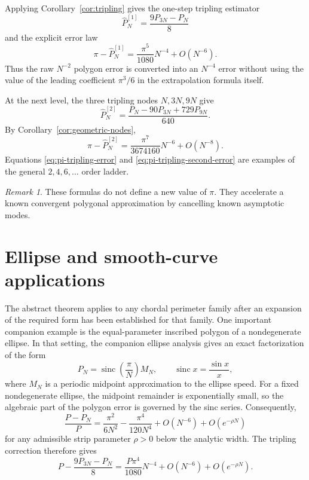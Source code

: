 \documentclass[11pt]{article}
\theoremstyle{remark}
\newtheorem{remark}[theorem]{Remark}
\newcommand{\sinc}{\operatorname{sinc}}
\begin{document}
Applying Corollary~\ref{cor:tripling} gives the one-step tripling estimator
\begin{equation}
\label{eq:pi-tripling}
\widehat P_N^{[1]}
=
\frac{9P_{3N}-P_N}{8}
\end{equation}
and the explicit error law
\begin{equation}
\label{eq:pi-tripling-error}
\pi-\widehat P_N^{[1]}
=
\frac{\pi^5}{1080}N^{-4}
+O(N^{-6}).
\end{equation}
Thus the raw $N^{-2}$ polygon error is converted into an $N^{-4}$ error
without using the value of the leading coefficient $\pi^3/6$ in the
extrapolation formula itself.

At the next level, the three tripling nodes $N,3N,9N$ give
\begin{equation}
\label{eq:pi-tripling-second}
\widehat P_N^{[2]}
=
\frac{P_N-90P_{3N}+729P_{9N}}{640}.
\end{equation}
By Corollary~\ref{cor:geometric-nodes},
\begin{equation}
\label{eq:pi-tripling-second-error}
\pi-\widehat P_N^{[2]}
=
\frac{\pi^7}{3674160}N^{-6}
+O(N^{-8}).
\end{equation}
Equations \eqref{eq:pi-tripling-error} and
\eqref{eq:pi-tripling-second-error} are examples of the general
$2,4,6,\ldots$ order ladder.

\begin{remark}
These formulas do not define a new value of $\pi$.  They accelerate a known
convergent polygonal approximation by cancelling known asymptotic modes.
\end{remark}

\section{Ellipse and smooth-curve applications}

The abstract theorem applies to any chordal perimeter family after an
expansion of the required form has been established for that family.  One
important companion example is the equal-parameter inscribed polygon of a
nondegenerate ellipse.  In that setting, the companion ellipse analysis gives
an exact factorization of the form
\begin{equation}
\label{eq:ellipse-factorization}
P_N
=
\sinc\!\left(\frac{\pi}{N}\right)M_N,
\qquad
\sinc x=\frac{\sin x}{x},
\end{equation}
where $M_N$ is a periodic midpoint approximation to the ellipse speed.  For a
fixed nondegenerate ellipse, the midpoint remainder is exponentially small,
so the algebraic part of the polygon error is governed by the sinc series.
Consequently,
\begin{equation}
\label{eq:ellipse-expansion}
\frac{P-P_N}{P}
=
\frac{\pi^2}{6N^2}
-
\frac{\pi^4}{120N^4}
+
O(N^{-6})+O(e^{-\rho N})
\end{equation}
for any admissible strip parameter $\rho>0$ below the analytic width.
The tripling correction therefore gives
\begin{equation}
\label{eq:ellipse-tripling}
P-\frac{9P_{3N}-P_N}{8}
=
\frac{P\pi^4}{1080}N^{-4}
+O(N^{-6})+O(e^{-\rho N}).
\end{equation}
\end{document}
